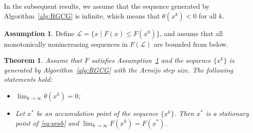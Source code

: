 \documentclass[pdflatex,sn-mathphys-num]{sn-jnl}%
\newtheorem{theorem}{Theorem}[section] %
\theoremstyle{definition} %
\newtheorem{assumption}{Assumption} %
\theoremstyle{remark} %
\begin{document}
In the subsequent results, we assume that the sequence generated by Algorithm~\ref{alg:RGCG} is infinite, which means that $\theta(x^k)<0$ for all $k$.

\begin{assumption}
\label{assum lowerbounded}
    Define \(\mathcal{L} = \{ x \mid F(x) \leq F(x^0) \}\), and assume that all monotonically nonincreasing sequences in \(F(\mathcal{L})\) are bounded from below.
\end{assumption}

    
    \begin{theorem}\label{thm armijo1}
        Assume that \(F\) satisfies Assumption~\ref{assum lowerbounded}
        and the sequence \(\{x^k\}\) is generated by Algorithm~\ref{alg:RGCG} with the Armijo step size. The following statements hold:
        \begin{itemize}
            \item[(1)] $\lim _{k \rightarrow \infty} \theta(x^k)=0$;
            \item[(2)]  Let $x^*$ be an accumulation point of the sequence $\{x^k\}$. Then $x^*$ is a stationary point of \eqref{eq:prob} and $\lim _{k \rightarrow \infty} F(x^k)=F(x^*)$.
        \end{itemize}
    \end{theorem}
\end{document}
